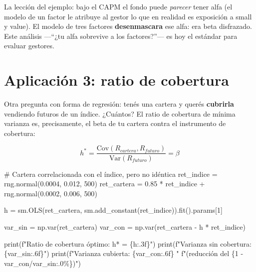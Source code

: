 \documentclass[
  spanish,
  letterpaper,
  DIV=11,
  numbers=noendperiod]{scrreprt}
\newenvironment{Shaded}{\begin{snugshade}}{\end{snugshade}}
\newcommand{\BuiltInTok}[1]{\textcolor[rgb]{0.00,0.23,0.31}{#1}}
\newcommand{\CommentTok}[1]{\textcolor[rgb]{0.37,0.37,0.37}{#1}}
\newcommand{\DecValTok}[1]{\textcolor[rgb]{0.68,0.00,0.00}{#1}}
\newcommand{\FloatTok}[1]{\textcolor[rgb]{0.68,0.00,0.00}{#1}}
\newcommand{\NormalTok}[1]{\textcolor[rgb]{0.00,0.23,0.31}{#1}}
\newcommand{\OperatorTok}[1]{\textcolor[rgb]{0.37,0.37,0.37}{#1}}
\newcommand{\SpecialCharTok}[1]{\textcolor[rgb]{0.37,0.37,0.37}{#1}}
\newcommand{\SpecialStringTok}[1]{\textcolor[rgb]{0.13,0.47,0.30}{#1}}
\begin{document}
La lección del ejemplo: bajo el CAPM el fondo puede \emph{parecer} tener
alfa (el modelo de un factor le atribuye al gestor lo que en realidad es
exposición a small y value). El modelo de tres factores
\textbf{desenmascara} ese alfa: era beta disfrazado. Este análisis
---``¿tu alfa sobrevive a los factores?''--- es hoy el estándar para
evaluar gestores.

\section{Aplicación 3: ratio de
cobertura}\label{aplicaciuxf3n-3-ratio-de-cobertura}

Otra pregunta con forma de regresión: tenés una cartera y querés
\textbf{cubrirla} vendiendo futuros de un índice. ¿Cuántos? El ratio de
cobertura de mínima varianza es, precisamente, el beta de tu cartera
contra el instrumento de cobertura:

\[h^* = \frac{\text{Cov}(R_{cartera}, R_{futuro})}{\text{Var}(R_{futuro})} = \beta\]

\label{hedge-ratio}
\begin{Shaded}
\begin{Highlighting}[]
\CommentTok{\# Cartera correlacionada con el índice, pero no idéntica}
\NormalTok{ret\_indice }\OperatorTok{=}\NormalTok{ rng.normal(}\FloatTok{0.0004}\NormalTok{, }\FloatTok{0.012}\NormalTok{, }\DecValTok{500}\NormalTok{)}
\NormalTok{ret\_cartera }\OperatorTok{=} \FloatTok{0.85} \OperatorTok{*}\NormalTok{ ret\_indice }\OperatorTok{+}\NormalTok{ rng.normal(}\FloatTok{0.0002}\NormalTok{, }\FloatTok{0.006}\NormalTok{, }\DecValTok{500}\NormalTok{)}

\NormalTok{h }\OperatorTok{=}\NormalTok{ sm.OLS(ret\_cartera, sm.add\_constant(ret\_indice)).fit().params[}\DecValTok{1}\NormalTok{]}

\NormalTok{var\_sin }\OperatorTok{=}\NormalTok{ np.var(ret\_cartera)}
\NormalTok{var\_con }\OperatorTok{=}\NormalTok{ np.var(ret\_cartera }\OperatorTok{{-}}\NormalTok{ h }\OperatorTok{*}\NormalTok{ ret\_indice)}

\BuiltInTok{print}\NormalTok{(}\SpecialStringTok{f"Ratio de cobertura óptimo: h* = }\SpecialCharTok{\{}\NormalTok{h}\SpecialCharTok{:.3f\}}\SpecialStringTok{"}\NormalTok{)}
\BuiltInTok{print}\NormalTok{(}\SpecialStringTok{f"Varianza sin cobertura: }\SpecialCharTok{\{}\NormalTok{var\_sin}\SpecialCharTok{:.6f\}}\SpecialStringTok{"}\NormalTok{)}
\BuiltInTok{print}\NormalTok{(}\SpecialStringTok{f"Varianza cubierta:      }\SpecialCharTok{\{}\NormalTok{var\_con}\SpecialCharTok{:.6f\}}\SpecialStringTok{  "}
      \SpecialStringTok{f"(reducción del }\SpecialCharTok{\{}\DecValTok{1} \OperatorTok{{-}}\NormalTok{ var\_con}\OperatorTok{/}\NormalTok{var\_sin}\SpecialCharTok{:.0\%\}}\SpecialStringTok{)"}\NormalTok{)}
\end{Highlighting}
\end{Shaded}
\end{document}
